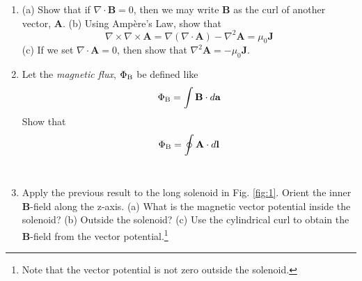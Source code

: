 \documentclass[10pt]{article}
\begin{document}
\begin{enumerate}
\item (a) Show that if $\nabla \cdot \mathbf{B} = 0$, then we may write $\mathbf{B}$ as the curl of another vector, $\mathbf{A}$.  (b) Using Amp\`{e}re's Law, show that
\begin{equation}
\nabla \times \nabla \times \mathbf{A} = \nabla\left(\nabla \cdot \mathbf{A}\right) - \nabla^2 \mathbf{A} = \mu_0 \mathbf{J}
\end{equation}
(c) If we set $\nabla \cdot \mathbf{A} = 0$, then show that $\nabla^2 \mathbf{A} = -\mu_0 \mathbf{J}$. \\ \vspace{4cm}
\item Let the \textit{magnetic flux}, $\Phi_{\rm B}$ be defined like
\begin{equation}
\Phi_{\rm B} = \int \mathbf{B} \cdot d\mathbf{a}
\end{equation}
Show that
\begin{equation}
\Phi_{\rm B} = \oint \mathbf{A} \cdot d\mathbf{l}
\end{equation} \\ \vspace{2cm}
\item Apply the previous result to the long solenoid in Fig. \ref{fig:1}.  Orient the inner $\mathbf{B}$-field along the z-axis.  (a) What is the magnetic vector potential inside the solenoid?  (b) Outside the solenoid? (c) Use the cylindrical curl to obtain the $\mathbf{B}$-field from the vector potential.\footnote{Note that the vector potential is not zero outside the solenoid.} \\ \vspace{4cm}
\end{enumerate}
\end{document}
